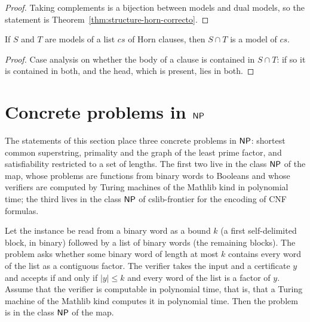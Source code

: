 \begin{proof}
  \leanok
  Taking complements is a bijection between models and dual models, so the statement is
  Theorem~\ref{thm:structure-horn-correcto}.
\end{proof}

\begin{proposition}
  \label{prop:structure-modelo-inter}
  \leanok
  If $S$ and $T$ are models of a list $cs$ of Horn clauses, then $S \cap T$ is a model of $cs$.
\end{proposition}

\begin{proof}
  \leanok
  Case analysis on whether the body of a clause is contained in $S \cap T$: if so it is contained
  in both, and the head, which is present, lies in both.
\end{proof}

\section{Concrete problems in $\mathsf{NP}$}
\label{sec:structure-concrete}

The statements of this section place three concrete problems in $\mathsf{NP}$: shortest common
superstring, primality and the graph of the least prime factor, and satisfiability restricted to
a set of lengths. The first two live in the class $\mathsf{NP}$ of the map, whose problems are functions
from binary words to Booleans and whose verifiers are computed by Turing machines of the Mathlib
kind in polynomial time; the third lives in the class $\mathsf{NP}$ of cslib-frontier for the encoding of
CNF formulas.

\begin{theorem}
  \label{thm:structure-supercadena}
  \leanok
  Let the instance be read from a binary word as a bound $k$ (a first self-delimited block, in
  binary) followed by a list of binary words (the remaining blocks). The problem asks whether some
  binary word of length at most $k$ contains every word of the list as a contiguous factor. The
  verifier takes the input and a certificate $y$ and accepts if and only if $|y| \le k$ and every
  word of the list is a factor of $y$. Assume that the verifier is computable in polynomial time,
  that is, that a Turing machine of the Mathlib kind computes it in polynomial time. Then the problem
  is in the class $\mathsf{NP}$ of the map.
\end{theorem}

